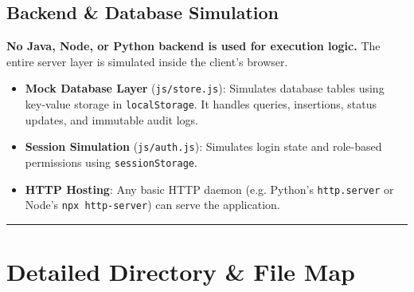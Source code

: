 \documentclass{article}
\begin{document}
\subsection{Backend \& Database Simulation}
\begin{important}
\textbf{No Java, Node, or Python backend is used for execution logic.} The entire server layer is simulated inside the client's browser.
\end{important}

\begin{itemize}
    \item \textbf{Mock Database Layer} (\texttt{js/store.js}): Simulates database tables using key-value storage in \texttt{localStorage}. It handles queries, insertions, status updates, and immutable audit logs.
    \item \textbf{Session Simulation} (\texttt{js/auth.js}): Simulates login state and role-based permissions using \texttt{sessionStorage}.
    \item \textbf{HTTP Hosting}: Any basic HTTP daemon (e.g. Python's \texttt{http.server} or Node's \texttt{npx http-server}) can serve the application.
\end{itemize}

\begin{center}\rule{0.5\linewidth}{0.5pt}\end{center}

\section{Detailed Directory \& File Map}
\end{document}
